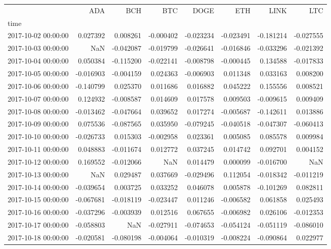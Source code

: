 \begin{tabular}{lrrrrrrr}
\toprule
 & ADA & BCH & BTC & DOGE & ETH & LINK & LTC \\
time &  &  &  &  &  &  &  \\
\midrule
2017-10-02 00:00:00 & 0.027392 & 0.008261 & -0.000402 & -0.023234 & -0.023491 & -0.181214 & -0.027555 \\
2017-10-03 00:00:00 & NaN & -0.042087 & -0.019799 & -0.026641 & -0.016846 & -0.033296 & -0.021392 \\
2017-10-04 00:00:00 & 0.050384 & -0.115200 & -0.022141 & -0.008798 & -0.000445 & 0.134588 & -0.017833 \\
2017-10-05 00:00:00 & -0.016903 & -0.004159 & 0.024363 & -0.006903 & 0.011348 & 0.033163 & 0.008200 \\
2017-10-06 00:00:00 & -0.140799 & 0.025370 & 0.011686 & 0.016882 & 0.045222 & 0.155556 & 0.008521 \\
2017-10-07 00:00:00 & 0.124932 & -0.008587 & 0.014609 & 0.017578 & 0.009503 & -0.009615 & 0.009409 \\
2017-10-08 00:00:00 & -0.013462 & -0.047664 & 0.039652 & 0.017274 & -0.005687 & -0.142611 & 0.013886 \\
2017-10-09 00:00:00 & 0.075536 & -0.087565 & 0.035950 & -0.079245 & -0.040518 & -0.047307 & -0.060413 \\
2017-10-10 00:00:00 & -0.026733 & 0.015303 & -0.002958 & 0.023361 & 0.005085 & 0.085578 & 0.009984 \\
2017-10-11 00:00:00 & 0.048883 & -0.011674 & 0.012772 & 0.037245 & 0.014742 & 0.092701 & 0.004152 \\
2017-10-12 00:00:00 & 0.169552 & -0.012066 & NaN & 0.014479 & 0.000099 & -0.016700 & NaN \\
2017-10-13 00:00:00 & NaN & 0.029487 & 0.037669 & -0.029496 & 0.112054 & -0.018342 & -0.011219 \\
2017-10-14 00:00:00 & -0.039654 & 0.003725 & 0.033252 & 0.046078 & 0.005878 & -0.101269 & 0.082811 \\
2017-10-15 00:00:00 & -0.067681 & -0.018119 & -0.023447 & 0.011246 & -0.006582 & 0.061858 & 0.025493 \\
2017-10-16 00:00:00 & -0.037296 & -0.003939 & 0.012516 & 0.067655 & -0.006982 & 0.026106 & -0.012353 \\
2017-10-17 00:00:00 & -0.058803 & NaN & -0.027911 & -0.074653 & -0.054124 & -0.051119 & -0.086010 \\
2017-10-18 00:00:00 & -0.020581 & -0.080198 & -0.004064 & -0.010319 & -0.008224 & -0.090864 & 0.022977 \\

\end{tabular}
